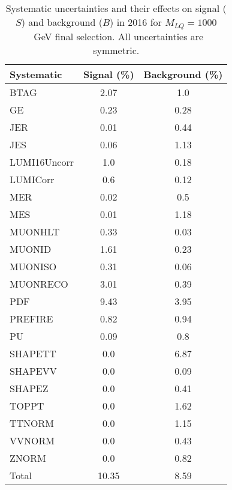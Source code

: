 \begin{table}[htbp]
\begin{center}
\caption{Systematic uncertainties and their effects on signal ($S$) and background ($B$) in 2016 for $M_{LQ}=1000$~GeV final selection. All uncertainties are symmetric.}
\begin{tabular}{lcc}
\hline\hline
Systematic & Signal (\%) & Background (\%) \\ \hline 
BTAG & 2.07 & 1.0\\ 
GE & 0.23 & 0.28\\ 
JER & 0.01 & 0.44\\ 
JES & 0.06 & 1.13\\ 
LUMI16Uncorr & 1.0 & 0.18\\ 
LUMICorr & 0.6 & 0.12\\ 
MER & 0.02 & 0.5\\ 
MES & 0.01 & 1.18\\ 
MUONHLT & 0.33 & 0.03\\ 
MUONID & 1.61 & 0.23\\ 
MUONISO & 0.31 & 0.06\\ 
MUONRECO & 3.01 & 0.39\\ 
PDF & 9.43 & 3.95\\ 
PREFIRE & 0.82 & 0.94\\ 
PU & 0.09 & 0.8\\ 
SHAPETT & 0.0 & 6.87\\ 
SHAPEVV & 0.0 & 0.09\\ 
SHAPEZ & 0.0 & 0.41\\ 
TOPPT & 0.0 & 1.62\\ 
TTNORM & 0.0 & 1.15\\ 
VVNORM & 0.0 & 0.43\\ 
ZNORM & 0.0 & 0.82\\ 
Total & 10.35 & 8.59\\ \hline \hline
\end{tabular}
\label{tab:SysUncertainties_uujj_1000}
\end{center}
\end{table}


